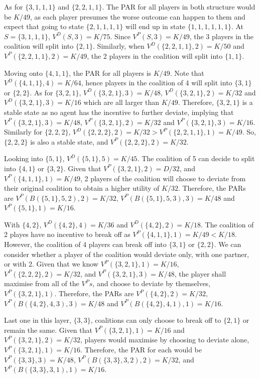 \documentclass[sigconf,anonymous]{aamas}
\begin{document}
As for $\{3, 1, 1, 1\}$ and $\{2, 2, 1, 1\}$. The PAR for all players in both structure would be $K/49$, as each player presumes the worse outcome can happen to them and expect that going to state $\{2, 1, 1, 1, 1\}$ will end up in state $\{1, 1, 1, 1, 1, 1\}$. At $S=\{3, 1, 1, 1\}$, $V^D(S, 3) = K/75$. Since $V^P(S, 3) = K/49$, the 3 players in the coalition will split into $\{2, 1\}$. Similarly, when $V^D(\{2, 2, 1, 1\}, 2) = K/50$ and $V^P(\{2, 2, 1, 1\}, 2) = K/49$, the 2 players in the coalition will split into $\{1, 1\}$. 

Moving onto $\{4, 1, 1\}$, the PAR for all players is $K/49$. Note that $V^D(\{4, 1, 1\}, 4) = K/64$, hence players in the coalition of 4 will split into $\{3, 1\}$ or $\{2, 2\}$. As for $\{3, 2, 1\}$, $V^D(\{3, 2, 1\}, 3) = K/48$, $V^D(\{3, 2, 1\}, 2) = K/32$ and $V^D(\{3, 2, 1\}, 3) = K/16$ which are all larger than $K/49$. Therefore, $\{3, 2, 1\}$ is a stable state as no agent has the incentive to further deviate, implying that $V^P(\{3, 2, 1\}, 3) = K/48$, $V^P(\{3, 2, 1\}, 2) = K/32$ and $V^P(\{3, 2, 1\}, 3) = K/16$. Similarly for $\{2, 2, 2\}$, $V^D(\{2, 2, 2\}, 2) = K/32 > V^P(\{2, 2, 1, 1\}, 1) = K/49$. So, $\{2, 2, 2\}$ is also a stable state, and $V^P(\{2, 2, 2\}, 2) = K/32$. 

Looking into $\{5, 1\}$, $V^D(\{5, 1\}, 5) = K/45$. The coalition of 5 can decide to split into $\{4, 1\}$ or $\{3, 2\}$. Given that $V^P(\{3, 2, 1\}, 2) = D/32$, and $V^P(\{4, 1, 1\}, 1) = K/49$, 2 players of the coalition will choose to deviate from their original coalition to obtain a higher utility of $K/32$. Therefore, the PARs are $V^P(B(\{5, 1\}, 5, 2), 2) = K/32$, $V^P(B(\{5, 1\}, 5, 3), 3) = K/48$ and $V^P(\{5, 1\}, 1) = K/16$. 

With $\{4, 2\}$, $V^D(\{4, 2\}, 4) = K/36$ and $V^D(\{4, 2\}, 2) = K/18$. The coalition of 2 playes have no incentive to break off as $V^P(\{4, 1, 1\}, 1) = K/49 < K/18$. However, the coalition of 4 players can break off into $\{3, 1\}$ or $\{2, 2\}$. We can consider whether a player of the coalition would deviate only, with one partner, or with 2. Given that we know $V^P(\{3, 2, 1\}, 1) = K/16$, $V^P(\{2, 2, 2\}, 2) = K/32$, and $V^P(\{3, 2, 1\}, 3) = K/48$, the player shall maximise from all of the $V^Ps$, and choose to deviate by themselves, $V^P(\{3, 2, 1\}, 1)$. Therefore, the PARs are $V^P(\{4, 2\}, 2) = K/32$, $V^P(B(\{4, 2\}, 4, 3),3) = K/48$ and $V^P(B(\{4, 2\}, 4, 1), 1) = K/16$. 

Last one in this layer, $\{3, 3\}$, coalitions can only choose to break off to $\{2, 1\}$ or remain the same. Given that $V^P(\{3, 2, 1\}, 1) = K/16$ and $V^P(\{3, 2, 1\}, 2) = K/32$, players would maximise by choosing to deviate alone, $V^P(\{3, 2, 1\}, 1) = K/16$. Therefore, the PAR for each would be $V^P(\{3, 3\}, 3) = K/48$, $V^P(B(\{3, 3\}, 3, 2), 2) = K/32$, and $V^P(B(\{3, 3\}, 3, 1), 1) = K/16$. 
\end{document}
